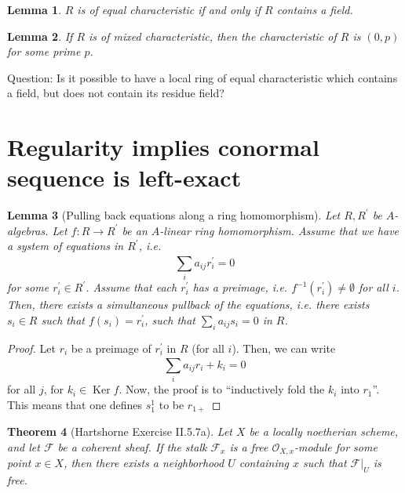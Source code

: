 \documentclass[a4paper]{article}
\newtheorem{thm}{Theorem}[section]
\newtheorem{lem}[thm]{Lemma}
\newcommand{\Ker}{\operatorname{Ker}}
\begin{document}
\begin{lem}
	\(R\) is of equal characteristic if and only if 
	\(R\) contains a field.
\end{lem}

\begin{lem}
	If \(R\) is of mixed characteristic, then the characteristic
	of \(R\) is \((0,p)\) for some prime \(p\).
\end{lem}

Question: Is it possible to have a local ring 
of equal characteristic which 
contains a field, but does not contain its residue field?



\section{Regularity implies conormal sequence is left-exact}

\begin{lem}
	[Pulling back equations along a ring homomorphism]
	Let \(R, R^{\prime}\) be \(A\)-algebras.
	Let \(f : R \to R^{\prime}\) be an \(A\)-linear ring homomorphism.
	Assume that we have a system of equations in \(R^{\prime}\),
	i.e.
	\[
	\sum_{i}^{} a_{ij}r_{i}^{\prime} = 0 
	\] 
	for some \(r_{i}^{\prime} \in R^{\prime}\).
	Assume that each \(r_{i}^{\prime}\) has a preimage,
	i.e. \(f^{-1}(r_{i}^{\prime}) \neq \emptyset\) 
	for all \(i\).
	Then, there exists a simultaneous pullback of
	the equations,
	i.e.
	there exists \(s_{i} \in R\) such that
	\(f(s_{i}) = r_{i}^{\prime}\),
	such that
	\(\sum_{i}^{} a_{ij}s_{i} = 0 \) in \(R\).
\end{lem}

\begin{proof}
	Let \(r_{i}\) be a preimage of \(r_{i}^{\prime}\) 
	in \(R\) (for all \(i\)).
	Then, we can write
	\[
	\sum_{i}^{} a_{ij}r_{i} + k_{i} = 0 
	\] 
	for all \(j\), for \(k_{i} \in \Ker f\).
	Now, the proof is to ``inductively
	fold the \(k_{i}\) into \(r_{1}\)''.
	This means that one defines
	\(s_{1}^{1}\) to be \(r_{1 + }\)

\end{proof}




\begin{thm}
	[Hartshorne Exercise II.5.7a]
	Let \(X\) be a locally noetherian scheme, and let
	\(\mathcal{F}\) be a coherent sheaf. 
	If the stalk \(\mathcal{F}_{x}\) is a free
	\(\mathcal{O}_{X,x} \)-module for some point
	\(x \in X\), then there exists
	a neighborhood \(U\) containing \(x\) such that
	\(\mathcal{F}|_{U}\) is free.
\end{thm}
\end{document}
